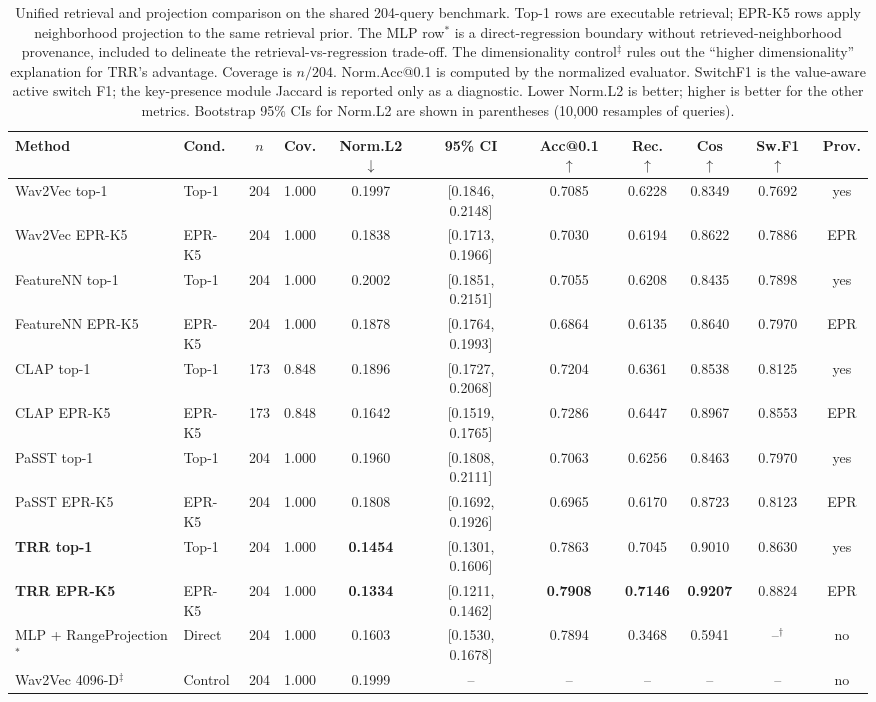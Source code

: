 \begin{table}[t]
\centering
\caption{Unified retrieval and projection comparison on the shared 204-query benchmark. Top-1 rows are executable retrieval; EPR-K5 rows apply neighborhood projection to the same retrieval prior. The MLP row$^*$ is a direct-regression boundary without retrieved-neighborhood provenance, included to delineate the retrieval-vs-regression trade-off. The dimensionality control$^\ddagger$ rules out the ``higher dimensionality'' explanation for TRR's advantage. Coverage is $n/204$. Norm.Acc@0.1 is computed by the normalized evaluator. SwitchF1 is the value-aware active switch F1; the key-presence module Jaccard is reported only as a diagnostic. Lower Norm.L2 is better; higher is better for the other metrics. Bootstrap 95\% CIs for Norm.L2 are shown in parentheses (10,000 resamples of queries).}
\label{tab:main_results}
\footnotesize
\setlength{\tabcolsep}{2.5pt}
\begin{tabular}{llccccccccc}
\toprule
\textbf{Method} & \textbf{Cond.} & \textbf{$n$} & \textbf{Cov.} & \textbf{Norm.L2} $\downarrow$ & \textbf{95\% CI} & \textbf{Acc@0.1} $\uparrow$ & \textbf{Rec.} $\uparrow$ & \textbf{Cos} $\uparrow$ & \textbf{Sw.F1} $\uparrow$ & \textbf{Prov.} \\
\midrule
Wav2Vec top-1 & Top-1 & 204 & 1.000 & 0.1997 & [0.1846, 0.2148] & 0.7085 & 0.6228 & 0.8349 & 0.7692 & yes \\
Wav2Vec EPR-K5 & EPR-K5 & 204 & 1.000 & 0.1838 & [0.1713, 0.1966] & 0.7030 & 0.6194 & 0.8622 & 0.7886 & EPR \\
FeatureNN top-1 & Top-1 & 204 & 1.000 & 0.2002 & [0.1851, 0.2151] & 0.7055 & 0.6208 & 0.8435 & 0.7898 & yes \\
FeatureNN EPR-K5 & EPR-K5 & 204 & 1.000 & 0.1878 & [0.1764, 0.1993] & 0.6864 & 0.6135 & 0.8640 & 0.7970 & EPR \\
CLAP top-1 & Top-1 & 173 & 0.848 & 0.1896 & [0.1727, 0.2068] & 0.7204 & 0.6361 & 0.8538 & 0.8125 & yes \\
CLAP EPR-K5 & EPR-K5 & 173 & 0.848 & 0.1642 & [0.1519, 0.1765] & 0.7286 & 0.6447 & 0.8967 & 0.8553 & EPR \\
PaSST top-1 & Top-1 & 204 & 1.000 & 0.1960 & [0.1808, 0.2111] & 0.7063 & 0.6256 & 0.8463 & 0.7970 & yes \\
PaSST EPR-K5 & EPR-K5 & 204 & 1.000 & 0.1808 & [0.1692, 0.1926] & 0.6965 & 0.6170 & 0.8723 & 0.8123 & EPR \\
\textbf{TRR top-1} & Top-1 & 204 & 1.000 & \textbf{0.1454} & [0.1301, 0.1606] & 0.7863 & 0.7045 & 0.9010 & 0.8630 & yes \\
\textbf{TRR EPR-K5} & EPR-K5 & 204 & 1.000 & \textbf{0.1334} & [0.1211, 0.1462] & \textbf{0.7908} & \textbf{0.7146} & \textbf{0.9207} & 0.8824 & EPR \\
MLP + RangeProjection$^*$ & Direct & 204 & 1.000 & 0.1603 & [0.1530, 0.1678] & 0.7894 & 0.3468 & 0.5941 & --$^{\dagger}$ & no \\
Wav2Vec 4096-D$^\ddagger$ & Control & 204 & 1.000 & 0.1999 & -- & -- & -- & -- & -- & no \\
\bottomrule
\end{tabular}
\end{table}

